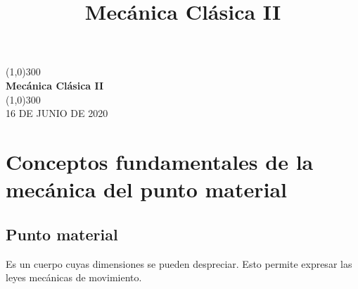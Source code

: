 \documentclass[11pt]{article}
\title{Mecánica Clásica II}
\begin{document}
\begin{titlepage}
	\begin{center}
    \line(1,0){300}\\
    [0.65cm]
	\huge{\bfseries Mecánica Clásica II}\\
	\line(1,0){300}\\
	\textsc{\LARGE 16 DE JUNIO DE 2020}\\
	[5.5cm]     
	\end{center}
\end{titlepage}

\section{Conceptos fundamentales de la mecánica del punto material}
\subsection{Punto material}
Es un cuerpo cuyas dimensiones se pueden despreciar. Esto permite expresar las leyes mecánicas de movimiento.
\end{document}
